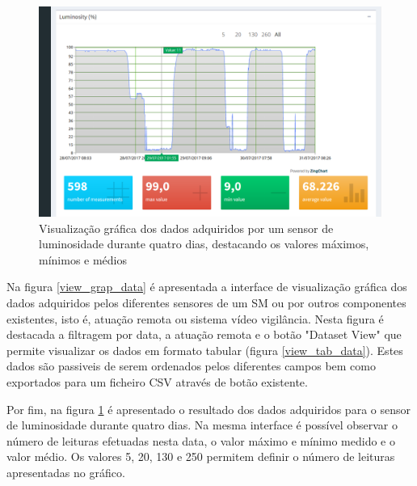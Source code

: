 \begin{figure}[h]
	\centering
	\includegraphics[width=0.9\linewidth]{prints-web/humidity.png}
	\caption{Visualização gráfica dos dados adquiridos por um sensor de luminosidade durante quatro dias, destacando os valores máximos, mínimos e médios}
	\label{grafico_humidade}
\end{figure}



Na figura \ref{view_grap_data} é apresentada a interface de visualização gráfica dos dados adquiridos pelos diferentes sensores de um \acl{SM} ou por outros componentes existentes, isto é, atuação remota ou sistema vídeo vigilância. Nesta figura é destacada a filtragem por data, a atuação remota e o botão "Dataset View" que permite visualizar os dados em formato tabular (figura \ref{view_tab_data}). Estes dados são passiveis de serem ordenados pelos diferentes campos bem como exportados para um ficheiro \ac{CSV} através de botão existente. 


Por fim, na figura \ref{grafico_humidade} é apresentado o resultado dos dados adquiridos para o sensor de luminosidade durante quatro dias. Na mesma interface é possível observar o número de leituras efetuadas nesta data, o valor máximo e mínimo medido e o valor médio. Os valores 5, 20, 130 e 250 permitem definir o número de leituras apresentadas no gráfico. 

 


